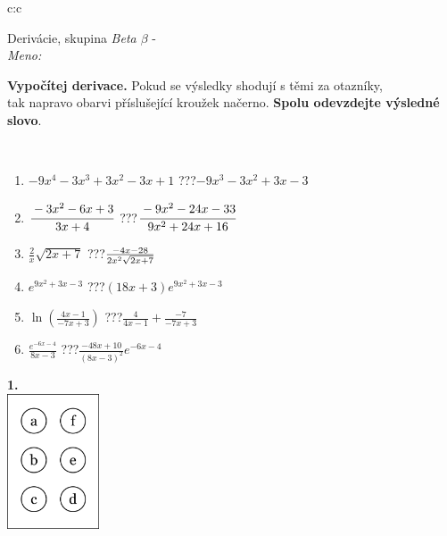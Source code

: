 \documentclass[10pt]{report}
\begin{document}
\begin{tabular}{c:c}
\begin{minipage}[c][104.5mm][t]{0.5\linewidth}
\begin{center}
\vspace{7mm}
{\huge Derivácie, skupina \textit{Beta $\beta$} -}\\[5mm]
\textit{Meno:}\phantom{xxxxxxxxxxxxxxxxxxxxxxxxxxxxxxxxxxxxxxxxxxxxxxxxxxxxxxxxxxxxxxxxx}\\[5mm]
\begin{minipage}{0.95\linewidth}
\begin{center}
\textbf{Vypočítej derivace.} Pokud se výsledky shodují s těmi za otazníky,\\tak napravo obarvi příslušející kroužek načerno. \textbf{Spolu odevzdejte výsledné slovo}.
\end{center}
\end{minipage}
\\[1mm]
\begin{minipage}{0.79\linewidth}
\begin{center}
\begin{varwidth}{\linewidth}
\begin{enumerate}
\normalsize
\item $-9x^4-3x^3+3x^2-3x+1$\quad \dotfill\; ???\;\dotfill \quad $-9x^3-3x^2+3x-3$
\item $\cfrac{-3x^2-6x+3}{3x+4}$\quad \dotfill\; ???\;\dotfill \quad $\cfrac{-9x^2-24x-33}{9x^2+24x+16}$
\item $\frac{2}{x}\sqrt{2x+7}$\quad \dotfill\; ???\;\dotfill \quad $\frac{-4x-28}{2x^2 \sqrt{\smash[b]{2x+7}}}$
\item $e^{9x^2+3x-3}$\quad \dotfill\; ???\;\dotfill \quad $(18x+3)e^{9x^2+3x-3}$
\item $\ln{\left(\frac{4x-1}{-7x+3}\right)}$\quad \dotfill\; ???\;\dotfill \quad $\frac{4}{4x-1}+\frac{-7}{-7x+3}$
\item $\frac{e^{-6x-4}}{8x-3}$\quad \dotfill\; ???\;\dotfill \quad $\frac{-48x+10}{(8x-3)^2}e^{-6x-4}$
\end{enumerate}
\end{varwidth}
\end{center}
\end{minipage}
\begin{minipage}{0.20\linewidth}
\begin{center}
{\Huge\bfseries 1.} \\[2mm]
\includegraphics[height=40mm]{../images/braille.png}

\end{center}
\end{minipage}
\end{center}
\end{minipage}
\end{tabular}
\end{document}
